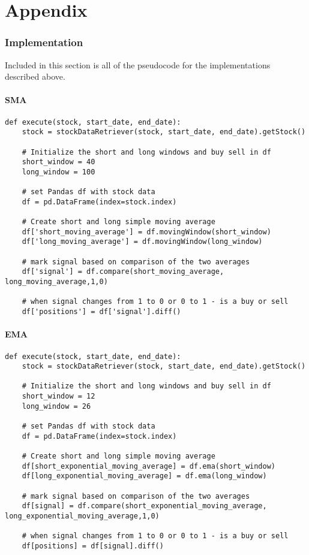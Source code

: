 \documentclass[../thesis.tex]{subfiles}
\begin{document}
\chapter{Appendix}
\label{ch:append}

\subsection{Implementation}

Included in this section is all of the pseudocode for the implementations described above.

\subsubsection{SMA}

\begin{verbatim}
def execute(stock, start_date, end_date):
    stock = stockDataRetriever(stock, start_date, end_date).getStock()

    # Initialize the short and long windows and buy sell in df
    short_window = 40
    long_window = 100
    
    # set Pandas df with stock data
    df = pd.DataFrame(index=stock.index)

    # Create short and long simple moving average 
    df['short_moving_average'] = df.movingWindow(short_window)
    df['long_moving_average'] = df.movingWindow(long_window)
    
    # mark signal based on comparison of the two averages
    df['signal'] = df.compare(short_moving_average, long_moving_average,1,0)
    
    # when signal changes from 1 to 0 or 0 to 1 - is a buy or sell
    df['positions'] = df['signal'].diff()

\end{verbatim}

\subsubsection{EMA }

\begin{verbatim}
def execute(stock, start_date, end_date):
    stock = stockDataRetriever(stock, start_date, end_date).getStock()

    # Initialize the short and long windows and buy sell in df
    short_window = 12
    long_window = 26

    # set Pandas df with stock data
    df = pd.DataFrame(index=stock.index)

    # Create short and long simple moving average
    df[short_exponential_moving_average] = df.ema(short_window)
    df[long_exponential_moving_average] = df.ema(long_window)

    # mark signal based on comparison of the two averages
    df[signal] = df.compare(short_exponential_moving_average, long_exponential_moving_average,1,0)

    # when signal changes from 1 to 0 or 0 to 1 - is a buy or sell
    df[positions] = df[signal].diff()

\end{verbatim}
\end{document}
